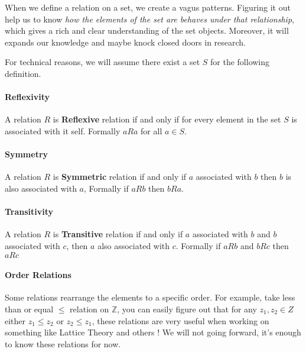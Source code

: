 When we define a relation on a set, we create a vagus patterns. Figuring it out help us to know {\it how the elements of the set are behaves under that relationship}, which gives a rich and clear understanding of the set objects. Moreover, it will expands our knowledge and maybe knock closed doors in research.

For technical reasons, we will assume there exist a set $S$ for the following definition.
\paragraph{Reflexivity} 
A relation $R$ is {\bf Reflexive} relation if and only if for every element in the set $S$ is associated with it self. Formally $aRa$ for all $a \in S$.
\paragraph{Symmetry} 
A relation $R$ is {\bf Symmetric} relation if and only if $a$ associated with $b$ then $b$ is also associated with $a$, Formally if $aRb$ then $bRa$.

\paragraph{Transitivity} 
A relation $R$ is {\bf Transitive} relation if and only if $a$ associated with $b$ and $b$ associated with $c$, then $a$ also associated with $c$. Formally if $aRb$ and $bRc$ then $aRc$

\paragraph{Order Relations} Some relations rearrange the elements to a specific order. For example, take less than or equal $\leq$ relation on $\mathbb{Z}$, you can easily figure out that for any $z_1,z_2 \in Z$ either $z_1 \leq z_2$ or $z_2 \leq z_1$, these relations are  very useful when working on something like Lattice Theory \cite{enwiki:945896905} and others \cite{enwiki:1038741711}! We will not going forward, it's enough to know these relations for now.
\vspace{20pt}





 